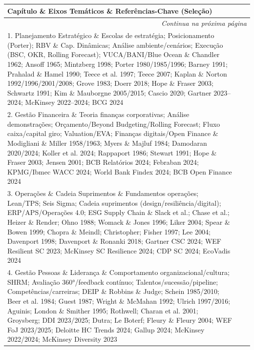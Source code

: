 \begin{longtable}{p{2.5cm}p{5.5cm}p{5.5cm}}
\toprule
\textbf{Capítulo} \& \textbf{Eixos Temáticos} \& \textbf{Referências-Chave (Seleção)}\\
\midrule
\endhead
\midrule
\multicolumn{3}{r}{\textit{Continua na próxima página}} \\
\endfoot
\bottomrule
\endlastfoot

1. Planejamento Estratégico \&
Escolas de estratégia; Posicionamento (Porter); RBV \& Cap. Dinâmicas; Análise ambiente/cenários; Execução (BSC, OKR, Rolling Forecast); VUCA/BANI/Blue Ocean \&
Chandler 1962; Ansoff 1965; Mintzberg 1998; Porter 1980/1985/1996; Barney 1991; Prahalad \& Hamel 1990; Teece et al. 1997; Teece 2007; Kaplan \& Norton 1992/1996/2001/2008; Grove 1983; Doerr 2018; Hope \& Fraser 2003; Schwartz 1991; Kim \& Mauborgne 2005/2015; Cascio 2020; Gartner 2023–2024; McKinsey 2022–2024; BCG 2024 \\

2. Gestão Financeira \&
Teoria finanças corporativas; Análise demonstrações; Orçamento/Beyond Budgeting/Rolling Forecast; Fluxo caixa/capital giro; Valuation/EVA; Finanças digitais/Open Finance \&
Modigliani \& Miller 1958/1963; Myers \& Majluf 1984; Damodaran 2020/2024; Koller et al. 2024; Rappaport 1986; Stewart 1991; Hope \& Fraser 2003; Jensen 2001; BCB Relatórios 2024; Febraban 2024; KPMG/Ibmec WACC 2024; World Bank Findex 2024; BCB Open Finance 2024 \\

3. Operações \& Cadeia Suprimentos \&
Fundamentos operações; Lean/TPS; Seis Sigma; Cadeia suprimentos (design/resiliência/digital); ERP/APS/Operações 4.0; ESG Supply Chain \&
Slack et al.; Chase et al.; Heizer \& Render; Ohno 1988; Womack \& Jones 1996; Liker 2004; Spear \& Bowen 1999; Chopra \& Meindl; Christopher; Fisher 1997; Lee 2004; Davenport 1998; Davenport \& Ronanki 2018; Gartner CSC 2024; WEF Resilient SC 2023; McKinsey SC Resilience 2024; CDP SC 2024; EcoVadis 2024 \\

4. Gestão Pessoas \& Liderança \&
Comportamento organizacional/cultura; SHRM; Avaliação 360°/feedback contínuo; Talentos/sucessão/pipeline; Competências/carreiras; DEIP \&
Robbins \& Judge; Schein 1985/2010; Beer et al. 1984; Guest 1987; Wright \& McMahan 1992; Ulrich 1997/2016; Aguinis; London \& Smither 1995; Rothwell; Charan et al. 2001; Groysberg; DDI 2023/2025; Dutra; Le Boterf; Fleury \& Fleury 2004; WEF FoJ 2023/2025; Deloitte HC Trends 2024; Gallup 2024; McKinsey 2022/2024; McKinsey Diversity 2023 \\


\end{longtable}
